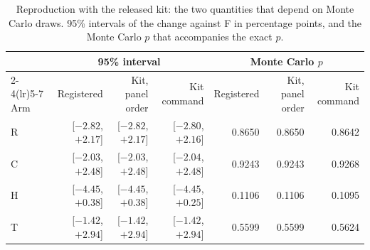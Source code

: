 \begin{table}[!htb]
\centering
\caption{Reproduction with the released kit: the two quantities that depend on Monte Carlo draws. 95\% intervals of the change against F in percentage points, and the Monte Carlo $p$ that accompanies the exact $p$.}\label{tab:s-repro}
\footnotesize
\begin{tabular}{lrrrrrr}
\toprule
 & \multicolumn{3}{c}{95\% interval} & \multicolumn{3}{c}{Monte Carlo $p$} \\
\cmidrule(lr){2-4}\cmidrule(lr){5-7}
Arm & Registered & Kit, panel order & Kit command & Registered & Kit, panel order & Kit command \\
\midrule
R & [${-}2.82$, ${+}2.17$] & [${-}2.82$, ${+}2.17$] & [${-}2.80$, ${+}2.16$] & 0.8650 & 0.8650 & 0.8642 \\
C & [${-}2.03$, ${+}2.48$] & [${-}2.03$, ${+}2.48$] & [${-}2.04$, ${+}2.48$] & 0.9243 & 0.9243 & 0.9268 \\
H & [${-}4.45$, ${+}0.38$] & [${-}4.45$, ${+}0.38$] & [${-}4.45$, ${+}0.25$] & 0.1106 & 0.1106 & 0.1095 \\
T & [${-}1.42$, ${+}2.94$] & [${-}1.42$, ${+}2.94$] & [${-}1.42$, ${+}2.94$] & 0.5599 & 0.5599 & 0.5624 \\
\bottomrule
\end{tabular}
\end{table}
